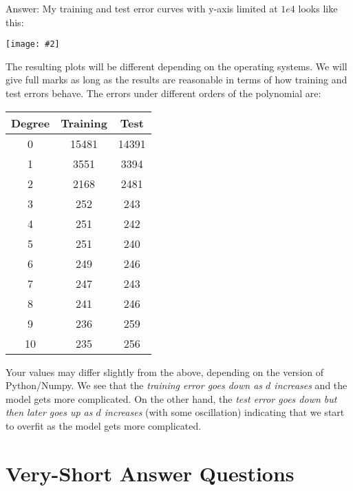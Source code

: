 \documentclass{article}
\def\ans#1{\par\gre{Answer: #1}}
\def\answer#1{\ans{#1}}
\def\gre#1{{\color{gre}#1}}
\newcommand{\centerfig}[2]{\begin{center}\texttt{[image: \#2]}\end{center}}
\begin{document}
\answer{
My training and test error curves with y-axis limited at $1e4$ looks like this:
\centerfig{.7}{../figs/polynomial_error_curves.png}
The resulting plots will be different depending on the operating systems. We will give full marks as long as the results are reasonable in terms of how training and test errors behave.
The errors under different orders of the polynomial are:\\
\begin{tabular}{ccc}
Degree & Training & Test\\
\hline
0 & 15481 & 14391\\
1 & 3551 & 3394\\
2 & 2168 & 2481\\
3 & 252 & 243\\
4 & 251 & 242\\
5 & 251 & 240\\
6 & 249 & 246\\
7 & 247 & 243\\
8 & 241 & 246\\
9 & 236 & 259\\
10 & 235 & 256
\end{tabular}
Your values may differ slightly from the above, depending on the version of Python/Numpy.
We see that the \emph{training error goes down as $d$ increases} and the model gets more complicated. On the other hand, the \emph{test error goes down but then later goes up as $d$ increases} (with some oscillation) indicating that we start to overfit as the model gets more complicated.
}

\section{Very-Short Answer Questions}
\end{document}
